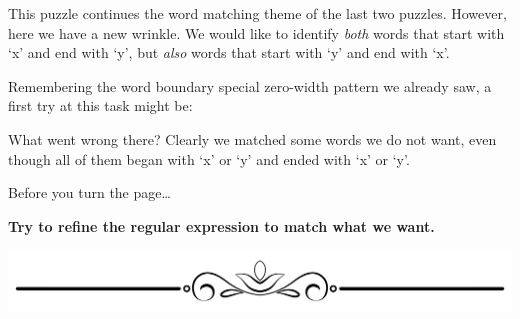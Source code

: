 This puzzle continues the word matching theme of the last two puzzles.
However, here we have a new wrinkle. We would like to identify
\emph{both} words that start with `x' and end with `y', but \emph{also}
words that start with `y' and end with `x'.

Remembering the word boundary special zero-width pattern we already saw,
a first try at this task might be:

\begin{Shaded}
\begin{Highlighting}[]
\OperatorTok{\textgreater{}\textgreater{}\textgreater{}}\OperatorTok{=} 

\StringTok{[xy][a{-}z]*[xy]}\StringTok{\textquotesingle{})}

\StringTok{[\textquotesingle{}yex\textquotesingle{}, \textquotesingle{}xenomorphically\textquotesingle{}, \textquotesingle{}xylology\textquotesingle{}, \textquotesingle{}yunx\textquotesingle{}, \textquotesingle{}xerochasy\textquotesingle{},}
\StringTok{\textquotesingle{}yonderly\textquotesingle{}, \textquotesingle{}xerox\textquotesingle{}]}
\end{Highlighting}
\end{Shaded}

What went wrong there? Clearly we matched some words we do not want,
even though all of them began with `x' or `y' and ended with `x' or `y'.

Before you turn the page\ldots{}

\textbf{Try to refine the regular expression to match what we want.}

\includegraphics{images/Elegant-Flourish-Frame-Extrapolated-19.svg}

\newpage

